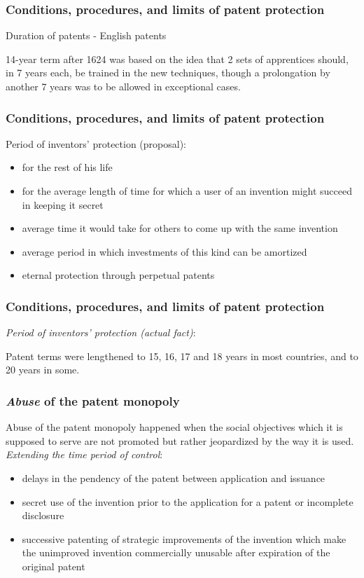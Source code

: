 \begin{frame}
\frametitle{Conditions, procedures, and limits of patent protection}
Duration of patents - English patents

14-year term after 1624 was based on the idea that 2 sets of apprentices should, in 7 years each, be trained in the new techniques, though a prolongation by another 7 years was to be allowed in exceptional cases.
\end{frame}

\begin{frame}
\frametitle{Conditions, procedures, and limits of patent protection}
Period of inventors' protection (proposal):
\begin{itemize}
	\item for the rest of his life
    \item for the average length of time for which a user of an invention might succeed in keeping it secret
    \item average time it would take for others to come up with the same invention
    \item average period in which investments of this kind can be amortized
    \item eternal protection through perpetual patents
\end{itemize}
\end{frame}


\begin{frame}
\frametitle{Conditions, procedures, and limits of patent protection}
\textit{Period of inventors' protection (actual fact)}:

Patent terms were lengthened to 15, 16, 17 and 18 years in most countries, and to 20 years in some.
\end{frame}


\begin{frame}
\frametitle{\textit{Abuse} of the patent monopoly}
Abuse of the patent monopoly happened when the social objectives which it is supposed to serve are not promoted but rather jeopardized by the way it is used.\\
\textit{Extending the time period of control}:
\begin{itemize}
	\item delays in the pendency of the patent between application and issuance
	\item secret use of the invention prior to the application for a patent or incomplete disclosure
    \item successive patenting of strategic improvements of the invention which make the unimproved invention commercially unusable after expiration of the original patent
    \end{itemize}
\end{frame}

